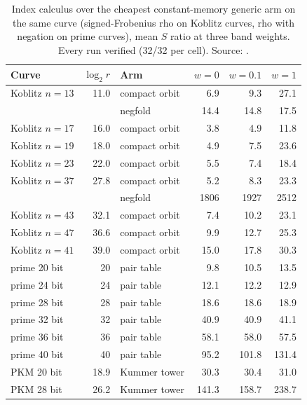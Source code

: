\begin{table}[t]
\centering\small
\caption[]{Index calculus over the cheapest constant-memory generic arm on
the same curve (signed-Frobenius rho on Koblitz curves, rho with negation
on prime curves), mean $S$ ratio at three band weights. Every run verified
(32/32 per cell). Source:
.}
\label{tab:campaign}
\begin{tabular}{@{}lrlrrr@{}}
\toprule
Curve & $\log_2 r$ & Arm & $w=0$ & $w=0.1$ & $w=1$ \\
\midrule
Koblitz $n=13$ & 11.0 & compact orbit & 6.9 & 9.3 & 27.1 \\
               &      & negfold       & 14.4 & 14.8 & 17.5 \\
Koblitz $n=17$ & 16.0 & compact orbit & 3.8 & 4.9 & 11.8 \\
Koblitz $n=19$ & 18.0 & compact orbit & 4.9 & 7.5 & 23.6 \\
Koblitz $n=23$ & 22.0 & compact orbit & 5.5 & 7.4 & 18.4 \\
Koblitz $n=37$ & 27.8 & compact orbit & 5.2 & 8.3 & 23.3 \\
               &      & negfold       & 1806 & 1927 & 2512 \\
Koblitz $n=43$ & 32.1 & compact orbit & 7.4 & 10.2 & 23.1 \\
Koblitz $n=47$ & 36.6 & compact orbit & 9.9 & 12.7 & 25.3 \\
Koblitz $n=41$ & 39.0 & compact orbit & 15.0 & 17.8 & 30.3 \\
\addlinespace
prime 20 bit & 20 & pair table & 9.8 & 10.5 & 13.5 \\
prime 24 bit & 24 & pair table & 12.1 & 12.2 & 12.9 \\
prime 28 bit & 28 & pair table & 18.6 & 18.6 & 18.9 \\
prime 32 bit & 32 & pair table & 40.9 & 40.9 & 41.1 \\
prime 36 bit & 36 & pair table & 58.1 & 58.0 & 57.5 \\
prime 40 bit & 40 & pair table & 95.2 & 101.8 & 131.4 \\
\addlinespace
PKM 20 bit & 18.9 & Kummer tower & 30.3 & 30.4 & 31.0 \\
PKM 28 bit & 26.2 & Kummer tower & 141.3 & 158.7 & 238.7 \\
\bottomrule
\end{tabular}
\end{table}

